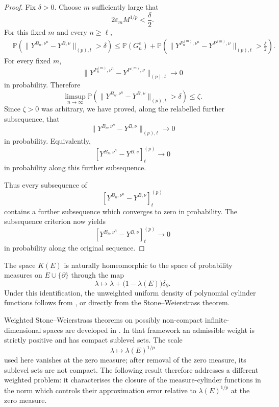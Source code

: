 \documentclass[a4paper,10pt]{article}
\renewcommand{\P}{\mathbb P}
\begin{document}
\begin{proof}
Fix \(\delta>0\). Choose \(m\) sufficiently large that
\[
        2\varepsilon_mM^{1/p}
        <
        \frac{\delta}{2}.
\]
For this fixed \(m\) and every \(n\ge\ell\),
\[
\begin{aligned}
&\P\left(
\lVert
Y^{B_n,\nu^n}-Y^{B,\nu}
\rVert_{(p),t}
>
\delta
\right)
\le
\P(G_n^c)
+
\P\left(
\lVert
Y^{P_n^{(m)},\nu^n}
-
Y^{P^{(m)},\nu}
\rVert_{(p),t}
>
\frac{\delta}{2}
\right).
\end{aligned}
\]
For every fixed \(m\),
\[
\lVert
Y^{P_n^{(m)},\nu^n}
-
Y^{P^{(m)},\nu}
\rVert_{(p),t}
\longrightarrow0
\]
in probability. Therefore
\[
\limsup_{n\to\infty}
\P\left(
\lVert
Y^{B_n,\nu^n}-Y^{B,\nu}
\rVert_{(p),t}
>
\delta
\right)
\le
\zeta.
\]
Since \(\zeta>0\) was arbitrary, we have proved, along the relabelled
further subsequence, that
\[
\lVert
Y^{B_n,\nu^n}-Y^{B,\nu}
\rVert_{(p),t}
\longrightarrow0
\]
in probability. Equivalently,
\[
        [Y^{B_n,\nu^n}-Y^{B,\nu}]^{(p)}_t
        \longrightarrow0
\]
in probability along this further subsequence.

Thus every subsequence of
\[
        [Y^{B_n,\nu^n}-Y^{B,\nu}]^{(p)}_t
\]
contains a further subsequence which converges to zero in probability.
The subsequence criterion now yields
\[
        [Y^{B_n,\nu^n}-Y^{B,\nu}]^{(p)}_t
        \longrightarrow0
\]
in probability along the original sequence.
\end{proof}

The space \(K(E)\) is naturally homeomorphic to the space of
probability measures on \(E\cup\{\partial\}\) through the map
\[
        \lambda
        \longmapsto
        \lambda+
        \bigl(1-\lambda(E)\bigr)\delta_{\partial}.
\]
Under this identification, the unweighted uniform density of
polynomial cylinder functions follows from
\cite[Lemma~2.7]{CuchieroLarssonSvalutoFerro}, or directly from the
Stone--Weierstrass theorem.

Weighted Stone--Weierstrass theorems on possibly non-compact
infinite-dimensional spaces are developed in
\cite{CuchieroSchmockerTeichmann}. In that framework an admissible
weight is strictly positive and has compact sublevel sets. The scale
\[
        \lambda\longmapsto\lambda(E)^{1/p}
\]
used here vanishes at the zero measure; after removal of the zero
measure, its sublevel sets are not compact. The following result
therefore addresses a different weighted problem: it characterises
the closure of the measure-cylinder functions in the norm which
controls their approximation error relative to
\(\lambda(E)^{1/p}\) at the zero measure.
\end{document}
